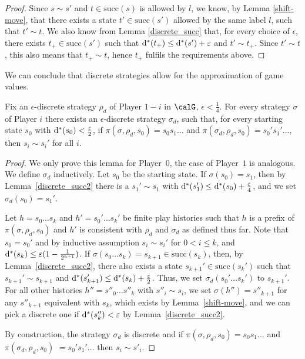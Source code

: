 \documentclass[fleqn,envcountsame]{LMCS}
\newcommand{\pzero}{Player~$0$\xspace}
\newcommand{\pone}{Player~$1$\xspace}
\newcommand{\successor}{\ensuremath{\mathrm{succ}}}
\begin{document}
\begin{proof}
Since $s \sim s'$ and $t \in \successor(s)$ is allowed by $l$, we know,
by Lemma \ref{shift-move}, that there exists a state $t' \in \successor(s')$
allowed by the same label $l$, such that $t' \sim t$.
We also know from Lemma \ref{discrete_succ} that,
for every choice of $\epsilon$, there exists $t_+ \in \successor(s')$
such that $\mathrm{d^*}(t_{+}) \leq \mathrm{d^*}(s') + \varepsilon$ and $t' \sim t_+$.
Since $t' \sim t$, this also means that $t_+ \sim t$,
hence $t_+$ fulfils the requirements above.
\end{proof}

We can conclude that discrete strategies allow for the approximation of game values.

\begin{lem} \label{discrete_strat}
Fix an $\epsilon$-discrete strategy $\rho_d$ of Player $1-i$ in $\calG$,
$\epsilon < \frac{1}{4}$. For every strategy $\sigma$ of Player $i$ there
exists an $\epsilon$-discrete strategy $\sigma_d$, such that,
for every starting state $s_0$ with $\mathrm{d^*}(s_0) < \frac{\varepsilon}{2}$,
if $\pi(\sigma, \rho_d, s_0) = s_0 s_1 \ldots$ and
$\pi(\sigma_d, \rho_d, s_0) = s_0' s_1' \ldots$,
then $s_i \sim s_i'$ for all $i$.
\end{lem}

\begin{proof}
We only prove this lemma for \pzero, the case of \pone is analogous.
We define $\sigma_d$ inductively. Let $s_0$ be the starting state.
If $\sigma(s_0)=s_1$, then by Lemma~\ref{discrete_succ2} there is a
$s_1' \sim s_1$ with $\mathrm{d^*}(s_1') \leq \mathrm{d^*}(s_0) + \frac{\varepsilon}{4}$,
and we set $\sigma_d(s_0)=s_1'$.

Let $h = s_0 \ldots s_k$ and $h' = s_0' \ldots s_k'$ be finite play
histories such that $h$ is a prefix of $\pi(\sigma, \rho_d, s_0)$
and $h'$ is consistent with $\rho_d$ and $\sigma_d$ as defined thus far.
Note that $s_0 = s_0'$ and by inductive assumption $s_i \sim s_i'$ for
$0 < i \leq k$, and $\mathrm{d^*}(s_{k}) \leq \varepsilon (1 - \frac 1 {2^{k+1}})$.
If $\sigma(s_0 \ldots s_k)=s_{k+1} \in \successor(s_k)$, then,
by Lemma~\ref{discrete_succ2}, there also exists 
a state $s_{k+1}' \in \successor(s_k')$ such that $s_{k+1}' \sim s_{k+1}$ and 
$\mathrm{d^*}(s_{k+1}') \leq \mathrm{d^*}(s_k) + \frac {\varepsilon}{2}$.
Thus, we set $\sigma_d(s_0' \ldots s_{k}')$ to $s_{k+1}'$.
For all other histories $h'' = s''_0 \ldots s''_k$ with $s''_i \sim s_i$,
we set $\sigma(h'') = s''_{k+1}$ for any $s''_{k+1}$ equivalent with $s_k$,
which exists by Lemma~\ref{shift-move}, and we can pick a discrete one
if $\mathrm{d^*}(s_{k}'') < \varepsilon$ by Lemma~\ref{discrete_succ2}.

By construction, the strategy $\sigma_d$ is discrete and if
$\pi(\sigma, \rho_d, s_0) = s_0 s_1 \ldots$ and
$\pi(\sigma_d, \rho_d, s_0)$ $= s_0' s_1' \ldots$ then $s_i \sim s'_i$.
\end{proof}
\end{document}
